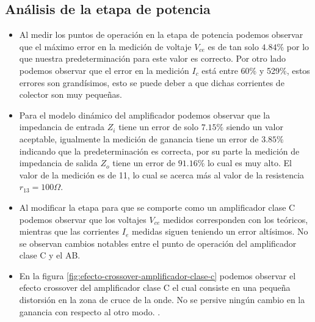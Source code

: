 \subsection{Análisis de la etapa de potencia}


\begin{itemize}
    \item Al medir los puntos de operación en la etapa de potencia podemos observar que el máximo error en la medición de voltaje $V_{ce}$ es de tan solo $4.84\%$ por lo que nuestra predeterminación para este valor es correcto. Por otro lado podemos observar que el error en la medición $I_c$ está entre 60\% y 529\%, estos errores son grandísimos, esto se puede deber a que dichas corrientes de colector son muy pequeñas.
    \item Para el modelo dinámico del amplificador podemos observar que la impedancia de entrada $Z_i$ tiene un error de solo $7.15\%$ siendo un valor aceptable, igualmente la medición de ganancia tiene un error de $3.85\%$ indicando que la predeterminación es correcta, por su parte la medición de impedancia de salida $Z_o$ tiene un error de $91.16\%$ lo cual es muy alto. El valor de la medición es de 11, lo cual se acerca más al valor de la resistencia $r_{13} = 100\Omega$.
    \item Al modificar la etapa para que se comporte como un amplificador clase C podemos observar que los voltajes $V_{ce}$ medidos corresponden con los teóricos, mientras que las corrientes $I_e$ medidas siguen teniendo un error altísimos. No se observan cambios notables entre el punto de operación del amplificador clase C y el AB. 
    \item En la figura \ref{fig:efecto-crossover-amplificador-clase-c} podemos observar el efecto crossover del amplificador clase C el cual consiste en una pequeña distorsión en la zona de cruce de la onde. No se persive ningún cambio en la ganancia con respecto al otro modo. .
\end{itemize}
